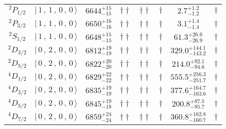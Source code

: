 \begin{tabular}{c| c c c c c c c}
$^{2}P_{1/2}$ & $\vert \,1\,,\,1\,,\,0\,,\,0 \,\rangle $ & $6644^{+15}_{-15}$ & $\dagger\dagger$ & $\dagger\dagger$ & $\dagger$ & $2.7^{+1.2}_{-1.2}$ & $\dagger$ \\ 
$^{2}P_{3/2}$ & $\vert \,1\,,\,1\,,\,0\,,\,0 \,\rangle $ & $6650^{+16}_{-16}$ & $\dagger\dagger$ & $\dagger\dagger$ & $\dagger$ & $3.1^{+1.4}_{-1.4}$ & $\dagger$ \\ 
$^{2}S_{1/2}$ & $\vert \,1\,,\,1\,,\,0\,,\,0 \,\rangle $ & $6648^{+15}_{-15}$ & $\dagger\dagger$ & $\dagger\dagger$ & $\dagger$ & $61.3^{+26.6}_{-26.9}$ & $\dagger$ \\ 
$^{2}D_{3/2}$ & $\vert \,0\,,\,2\,,\,0\,,\,0 \,\rangle $ & $6812^{+19}_{-19}$ & $\dagger\dagger$ & $\dagger\dagger$ & $\dagger$ & $329.0^{+144.1}_{-143.2}$ & $\dagger$ \\ 
$^{2}D_{5/2}$ & $\vert \,0\,,\,2\,,\,0\,,\,0 \,\rangle $ & $6822^{+20}_{-20}$ & $\dagger\dagger$ & $\dagger\dagger$ & $\dagger$ & $214.0^{+92.1}_{-94.6}$ & $\dagger$ \\ 
$^{4}D_{1/2}$ & $\vert \,0\,,\,2\,,\,0\,,\,0 \,\rangle $ & $6829^{+22}_{-22}$ & $\dagger\dagger$ & $\dagger\dagger$ & $\dagger$ & $555.5^{+256.3}_{-251.7}$ & $\dagger$ \\ 
$^{4}D_{3/2}$ & $\vert \,0\,,\,2\,,\,0\,,\,0 \,\rangle $ & $6835^{+19}_{-19}$ & $\dagger\dagger$ & $\dagger\dagger$ & $\dagger$ & $377.6^{+164.7}_{-163.6}$ & $\dagger$ \\ 
$^{4}D_{5/2}$ & $\vert \,0\,,\,2\,,\,0\,,\,0 \,\rangle $ & $6845^{+19}_{-18}$ & $\dagger\dagger$ & $\dagger\dagger$ & $\dagger$ & $200.8^{+87.5}_{-85.7}$ & $\dagger$ \\ 
$^{4}D_{7/2}$ & $\vert \,0\,,\,2\,,\,0\,,\,0 \,\rangle $ & $6859^{+24}_{-24}$ & $\dagger\dagger$ & $\dagger\dagger$ & $\dagger$ & $360.8^{+162.8}_{-160.7}$ & $\dagger$ \\ 
\hline \hline
\end{tabular}
